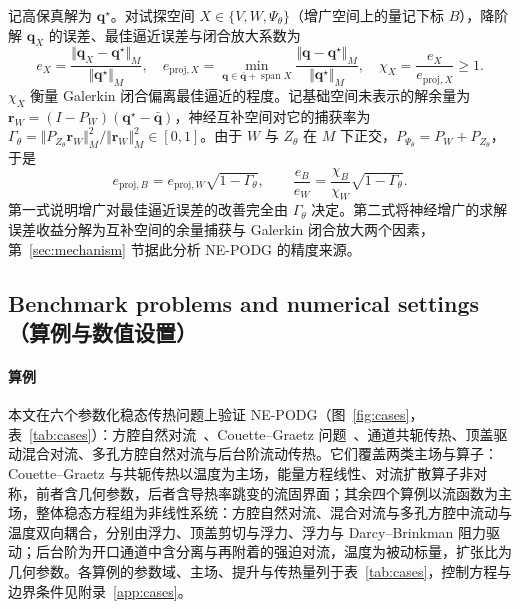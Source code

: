 记高保真解为 $\mathbf q^\star$。对试探空间 $X\in\{V,W,\Psi_\theta\}$（增广空间上的量记下标 $B$），降阶解 $\mathbf q_X$ 的误差、最佳逼近误差与闭合放大系数为
\begin{equation}
e_X=\frac{\Vert\mathbf q_X-\mathbf q^\star\Vert_M}{\Vert\mathbf q^\star\Vert_M},\quad
e_{\mathrm{proj},X}=\min_{\mathbf q\in\bar{\mathbf q}+\operatorname{span}X}\frac{\Vert\mathbf q-\mathbf q^\star\Vert_M}{\Vert\mathbf q^\star\Vert_M},\quad
\chi_X=\frac{e_X}{e_{\mathrm{proj},X}}\ge1 .
\label{eq:errors}
\end{equation}
$\chi_X$ 衡量 Galerkin 闭合偏离最佳逼近的程度。记基础空间未表示的解余量为 $\mathbf r_W=(I-P_W)(\mathbf q^\star-\bar{\mathbf q})$，神经互补空间对它的捕获率为 $\Gamma_\theta=\Vert P_{Z_\theta}\mathbf r_W\Vert_M^2/\Vert\mathbf r_W\Vert_M^2\in[0,1]$。由于 $W$ 与 $Z_\theta$ 在 $M$ 下正交，$P_{\Psi_\theta}=P_W+P_{Z_\theta}$，于是
\begin{equation}
e_{\mathrm{proj},B}=e_{\mathrm{proj},W}\sqrt{1-\Gamma_\theta},\qquad
\frac{e_B}{e_W}=\frac{\chi_B}{\chi_W}\sqrt{1-\Gamma_\theta}.
\label{eq:error_ratio}
\end{equation}
第一式说明增广对最佳逼近误差的改善完全由 $\Gamma_\theta$ 决定。第二式将神经增广的求解误差收益分解为互补空间的余量捕获与 Galerkin 闭合放大两个因素，第~\ref{sec:mechanism} 节据此分析 NE-PODG 的精度来源。

\subsection{Benchmark problems and numerical settings（算例与数值设置）}
\label{sec:setup}

\paragraph{算例}
本文在六个参数化稳态传热问题上验证 NE-PODG（图~\ref{fig:cases}，表~\ref{tab:cases}）：方腔自然对流~\cite{devahldavis1983natural}、Couette--Graetz 问题~\cite{quarteroni2011certified}、通道共轭传热、顶盖驱动混合对流、多孔方腔自然对流与后台阶流动传热。它们覆盖两类主场与算子：Couette--Graetz 与共轭传热以温度为主场，能量方程线性、对流扩散算子非对称，前者含几何参数，后者含导热率跳变的流固界面；其余四个算例以流函数为主场，整体稳态方程组为非线性系统：方腔自然对流、混合对流与多孔方腔中流动与温度双向耦合，分别由浮力、顶盖剪切与浮力、浮力与 Darcy--Brinkman 阻力驱动；后台阶为开口通道中含分离与再附着的强迫对流，温度为被动标量，扩张比为几何参数。各算例的参数域、主场、提升与传热量列于表~\ref{tab:cases}，控制方程与边界条件见附录~\ref{app:cases}。

